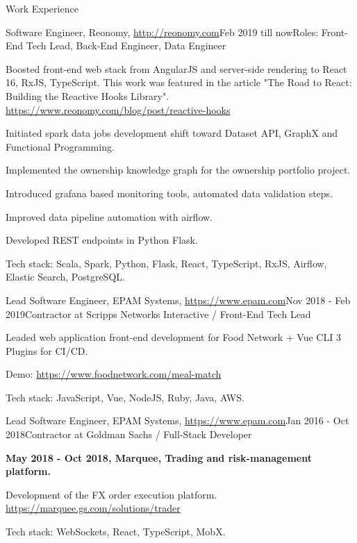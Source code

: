 \documentclass{resume}
\begin{document}
\begin{rSection}{Work Experience}

\begin{rSubsection}{Software Engineer, Reonomy, \url{http://reonomy.com}}{Feb 2019 till now}{Roles: Front-End Tech Lead, Back-End Engineer, Data Engineer}{}
\item Boosted front-end web stack from AngularJS and server-side rendering to React 16, RxJS, TypeScript.
This work was featured in the article "The Road to React: Building the Reactive Hooks Library".
\url{https://www.reonomy.com/blog/post/reactive-hooks}
\item Initiated spark data jobs development shift toward Dataset API, GraphX and Functional Programming.
\item Implemented the ownership knowledge graph for the ownership portfolio project.
\item Introduced grafana based monitoring tools, automated data validation steps.
\item Improved data pipeline automation with airflow.
\item Developed REST endpoints in Python Flask.

Tech stack: Scala, Spark, Python, Flask, React, TypeScript, RxJS, Airflow, Elastic Search, PostgreSQL.
\end{rSubsection}

\begin{rSubsection}{Lead Software Engineer, EPAM Systems, \url{https://www.epam.com}}{Nov 2018 - Feb 2019}{Contractor at Scripps Networks Interactive / Front-End Tech Lead}{}
\item Leaded web application front-end development for Food Network + Vue CLI 3 Plugins for CI/CD.

Demo: \url{https://www.foodnetwork.com/meal-match}

Tech stack: JavaScript, Vue, NodeJS, Ruby, Java, AWS.
\end{rSubsection}

\begin{rSubsection}{Lead Software Engineer, EPAM Systems, \url{https://www.epam.com}}{Jan 2016 - Oct 2018}{Contractor at Goldman Sachs / Full-Stack Developer}{}
\item[] \textbf{May 2018 - Oct 2018, Marquee, Trading and risk-management platform.}
\item Development of the FX order execution platform. \url{https://marquee.gs.com/solutions/trader}

Tech stack: WebSockets, React, TypeScript, MobX.


\end{rSubsection}
\end{rSection}
\end{document}
